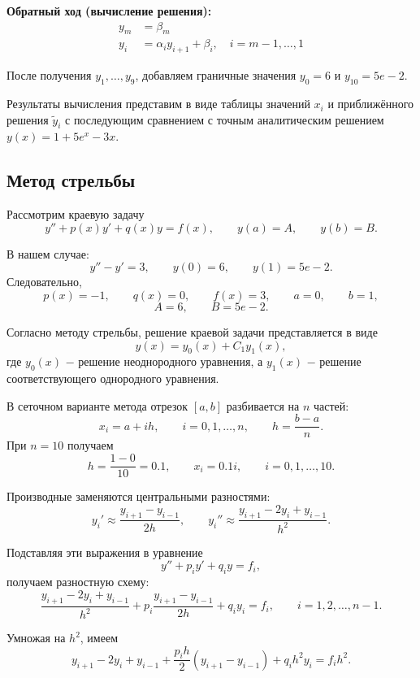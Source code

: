 \textbf{Обратный ход (вычисление решения):}
\begin{align*}
    y_m & = \beta_m                                              \\
    y_i & = \alpha_i y_{i+1} + \beta_i, \quad i = m-1, \ldots, 1
\end{align*}

После получения $y_1, \ldots, y_9$, добавляем граничные значения $y_0 = 6$ и $y_{10} = 5e - 2$.

Результаты вычисления представим в виде таблицы значений $x_i$ и приближённого решения $\tilde{y}_i$ с последующим сравнением с точным аналитическим решением $y(x) = 1 + 5e^x - 3x$.

\subsection*{Метод стрельбы}

Рассмотрим краевую задачу
\[
    y'' + p(x)y' + q(x)y = f(x), \qquad y(a)=A, \qquad y(b)=B.
\]

В нашем случае:
\[
    y'' - y' = 3, \qquad y(0)=6, \qquad y(1)=5e-2.
\]
Следовательно,
\[
    p(x)=-1, \qquad q(x)=0, \qquad f(x)=3, \qquad a=0, \qquad b=1,
\]
\[
    A=6, \qquad B=5e-2.
\]

Согласно методу стрельбы, решение краевой задачи представляется в виде
\[
    y(x)=y_0(x)+C_1y_1(x),
\]
где \(y_0(x)\) $-$ решение неоднородного уравнения, а \(y_1(x)\) $-$ решение соответствующего однородного уравнения.

В сеточном варианте метода отрезок \([a,b]\) разбивается на \(n\) частей:
\[
    x_i=a+ih, \qquad i=0,1,\dots,n, \qquad h=\frac{b-a}{n}.
\]
При \(n=10\) получаем
\[
    h=\frac{1-0}{10}=0.1, \qquad x_i=0.1i, \qquad i=0,1,\dots,10.
\]

Производные заменяются центральными разностями:
\[
    y_i' \approx \frac{y_{i+1}-y_{i-1}}{2h},
    \qquad
    y_i'' \approx \frac{y_{i+1}-2y_i+y_{i-1}}{h^2}.
\]

Подставляя эти выражения в уравнение
\[
    y'' + p_i y' + q_i y = f_i,
\]
получаем разностную схему:
\[
    \frac{y_{i+1}-2y_i+y_{i-1}}{h^2}
    + p_i \frac{y_{i+1}-y_{i-1}}{2h}
    + q_i y_i
    = f_i,
    \qquad i=1,2,\dots,n-1.
\]

Умножая на \(h^2\), имеем
\[
    y_{i+1}-2y_i+y_{i-1}
    +\frac{p_i h}{2}(y_{i+1}-y_{i-1})
    +q_i h^2 y_i
    = f_i h^2.
\]

